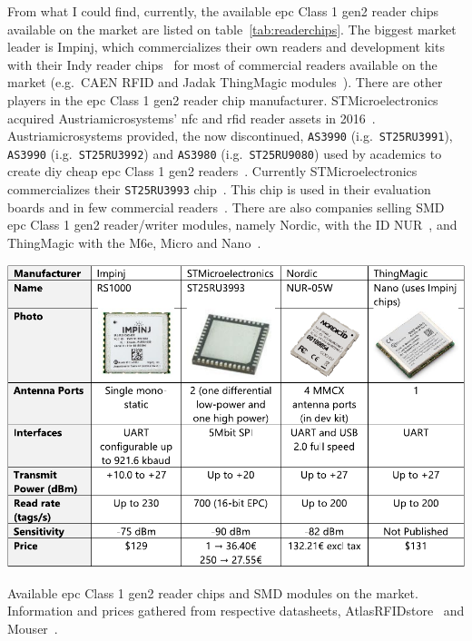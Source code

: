 From what I could find, currently, the available \ac{epc} Class 1 \ac{gen2} reader chips available on the market are listed on table~\ref{tab:readerchips}.
The biggest market leader is Impinj, which commercializes their own readers and development kits with their Indy reader chips~\cite{RAINRFIDReader} for most of commercial readers available on the market (e.g.\ CAEN RFID and Jadak ThingMagic modules~\cite{RAINRFIDPartner}).
There are other players in the \ac{epc} Class 1 \ac{gen2} reader chip manufacturer. 
STMicroelectronics acquired Austriamicrosystems' \ac{nfc} and \ac{rfid} reader assets in 2016~\cite{PressRelease}. Austriamicrosystems provided, the now discontinued, \texttt{AS3990} (i.g.\ \texttt{ST25RU3991}), \texttt{AS3990} (i.g.\ \texttt{ST25RU3992}) and \texttt{AS3980} (i.g.\ \texttt{ST25RU9080}) used by academics to create \acs{diy} cheap \ac{epc} Class 1 \ac{gen2} readers~\cite{tangDesignUHFRFID2010a, leiDesignHandheldUHF2011, liDesignRadioFrequency2011}. Currently STMicroelectronics
commercializes their \texttt{ST25RU3993} chip~\cite{ST25RU3993}. This chip is used in their evaluation boards and in few commercial readers~\cite{UHFMidRange}.
There are also companies selling SMD \ac{epc} Class 1 \ac{gen2} reader/writer modules, namely Nordic, with the ID NUR~\cite{NURModulesNordic}, and ThingMagic with the M6e, Micro and Nano~\cite{ThingMagicRFID}.

\begin{table}
    \centering
    \includegraphics[width=\linewidth]{./figs/02-state-of-the-art/table_chipreaders.pdf}
    \caption[Available \ac{epc} Class 1 \ac{gen2} reader chips and SMD modules on the market]{Available \ac{epc} Class 1 \ac{gen2} reader chips and SMD modules on the market. Information and prices gathered from respective datasheets, AtlasRFIDstore~\cite{AtlasRFIDstoreBuyRFID} and Mouser~\cite{DistribuidorComponentesEletronicos}.}
    \label{tab:readerchips}
\end{table}

